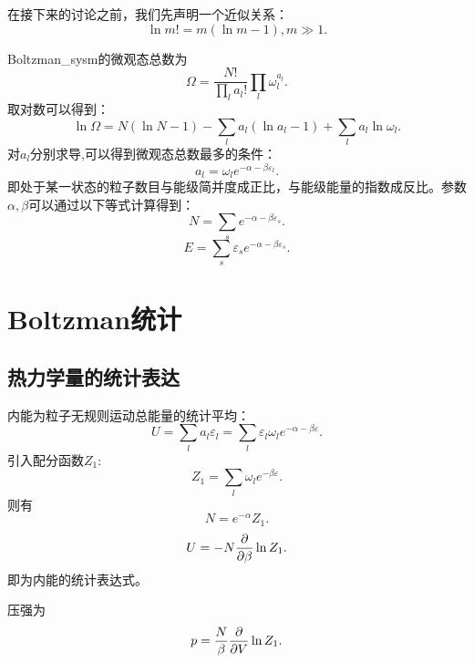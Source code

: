 在接下来的讨论之前，我们先声明一个近似关系：
\begin{equation}
    \ln m!=m(\ln m-1), m\gg 1.
\end{equation}

\gls{Boltzman_sysm}的微观态总数为
\begin{equation}
    \Omega=\frac{N!}{\prod_l a_l!}\prod_l \omega_l^{a_l}.
\end{equation}
取对数可以得到：
\begin{equation}
    \ln\Omega=N(\ln N-1)-\sum_l a_l(\ln a_l-1)+\sum_l a_l\ln\omega_l.
\end{equation}
对$a_l$分别求导,可以得到微观态总数最多的条件：
\begin{equation}
    a_l=\omega_le^{-\alpha-\beta\varepsilon_l}.
\end{equation}
即处于某一状态的粒子数目与能级简并度成正比，与能级能量的指数成反比。参数$\alpha,\beta$可以通过以下等式计算得到：
\begin{equation}
    N=\sum_s e^{-\alpha-\beta\varepsilon_s}.
\end{equation}
\begin{equation}
    E=\sum_s \varepsilon_s e^{-\alpha-\beta\varepsilon_s}.
\end{equation}

\section{Boltzman统计}
\subsection{热力学量的统计表达}
内能为粒子无规则运动总能量的统计平均：
\begin{equation}
    U=\sum_la_l\varepsilon_l=\sum_l\varepsilon_l\omega_l e^{-\alpha-\beta\varepsilon}.
\end{equation}
引入配分函数$Z_1$:
\begin{equation}
    Z_1=\sum_l\omega_le^{-\beta\varepsilon}.
\end{equation}
则有
\begin{equation}
    N=e^{-\alpha}Z_1.
\end{equation}
\begin{equation}
    U=-N\frac{\partial }{\partial \beta}\ln Z_1.
\end{equation}
即为内能的统计表达式。

压强为
\begin{equation}
    p=\frac{N}{\beta}\frac{\partial }{\partial V}\ln Z_1.
\end{equation}

